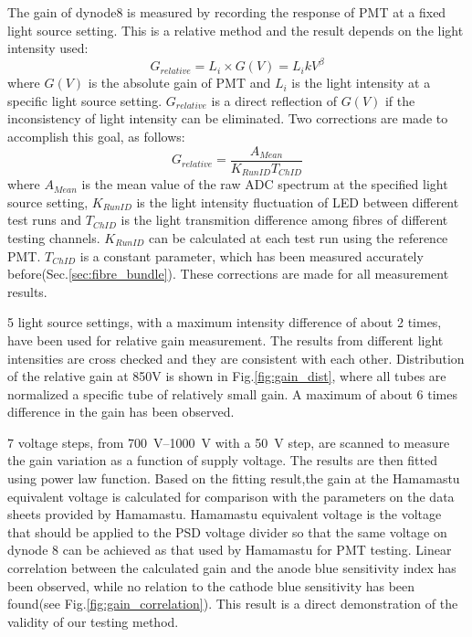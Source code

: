 \documentclass[5p, times]{elsarticle}
\begin{document}
The gain of dynode8 is measured by recording the response of PMT at a fixed light source setting. 
This is a relative method and the result depends on the light intensity used:
\begin{equation}
 G_{relative} = L_i \times G(V) = L_i k V^\beta
\end{equation}
where $G(V)$ is the absolute gain of PMT and $L_i$ is the light intensity at a specific light source setting.
$G_{relative}$ is a direct reflection of $G(V)$ if the inconsistency of light intensity can be eliminated.
Two corrections are made to accomplish this goal, as follows: 
\begin{equation}
 G_{relative} = \frac{A_{Mean}}{K_{RunID} T_{ChID}}
\end{equation} 
where $A_{Mean}$ is the mean value of the raw ADC spectrum at the specified light source setting,
$K_{RunID}$ is the light intensity fluctuation of LED between different test runs and $T_{ChID}$ is the light transmition difference among fibres of different testing channels.
$K_{RunID}$ can be calculated at each test run using the reference PMT.
$T_{ChID}$ is a constant parameter, which has been measured accurately before(Sec.\ref{sec:fibre_bundle}).
These corrections are made for all measurement results.

5 light source settings, with a maximum intensity difference of about 2 times, have been used for relative gain measurement.
The results from different light intensities are cross checked and they are consistent with each other.
Distribution of the relative gain at 850V is shown in Fig.\ref{fig:gain_dist}, where all tubes are normalized a specific tube of relatively small gain. 
A maximum of about 6 times difference in the gain has been observed.

7 voltage steps, from \SIrange{700}{1000}{\volt} with a \SI{50}{\volt} step, are scanned to measure the gain variation as a function of supply voltage.
The results are then fitted using power law function.
Based on the fitting result,the gain at the Hamamastu equivalent voltage is calculated for comparison with the parameters on the data sheets provided by Hamamastu.
Hamamastu equivalent voltage is the voltage that should be applied to the PSD voltage divider so that the same voltage on dynode 8 can be achieved as that used by Hamamastu for PMT testing.
Linear correlation between the calculated gain and the anode blue sensitivity index has been observed, while no relation to the cathode blue sensitivity has been found(see Fig.\ref{fig:gain_correlation}).
This result is a direct demonstration of the validity of our testing method.
\end{document}
